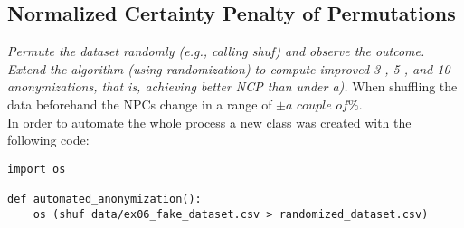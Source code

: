 \documentclass{report}
\begin{document}
		\subsection{Normalized Certainty Penalty of Permutations}
		\textit{Permute the dataset randomly (e.g., calling shuf) and observe the outcome. Extend the algorithm (using randomization) to compute improved 3-, 5-, and 10-anonymizations, that is, achieving better NCP than under a).}
		\startsubsection
			When shuffling the data beforehand the NPCs change in a range of $\pm \textit{a couple of} \%$. \\
			In order to automate the whole process a new class was created with the following code:
			\begin{verbatim}
import os

def automated_anonymization():
	os (shuf data/ex06_fake_dataset.csv > randomized_dataset.csv)
			\end{verbatim}
		\closesection
	\closesection
\end{document}
